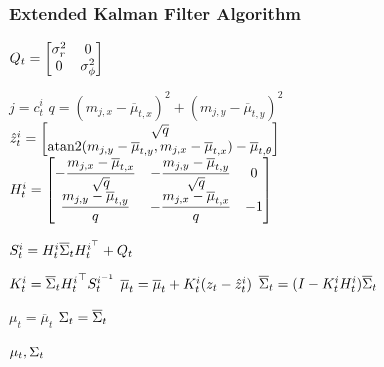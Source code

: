 \begin{frame}
   \frametitle{Extended Kalman Filter Algorithm}
   \footnotesize
   \begin{algorithmic}[1]
   \State
   $ Q_{t} =
   \begin{bmatrix}
   \sigma_{r}^{2} & 0\\
   0 & \sigma_{\phi}^{2}
    \end{bmatrix}
    $
   
    \State $ j = c_{t}^{i}$
    \State $ q = (m_{j,x}-\overline{\mu}_{t,x})^{2} + (m_{j,y}-\overline{\mu}_{t,y})^{2} $
    \State
    $ \hat{z}_{t}^{i} =
    \begin{bmatrix}
    \sqrt{q}\\
    \operatorname{atan2}(m_{j,y}-\overline{\mu}_{t,y}, m_{j,x}-\overline{\mu}_{t,x}) - \overline{\mu}_{t,\theta}
    \end{bmatrix}
    $
    \State
    $ H_{t}^{i} =
    \begin{bmatrix}
    -\dfrac{m_{j,x} - \overline{\mu}_{t,x}}{\sqrt{q}} & -\dfrac{m_{j,y} - \overline{\mu}_{t,y}}{\sqrt{q}} & 0\\
    \dfrac{m_{j,y} - \overline{\mu}_{t,y}}{q} & -\dfrac{m_{j,x} - \overline{\mu}_{t,x}}{q} & -1
    \end{bmatrix}
    $
   
    \State $S_{t}^{i} = H_{t}^{i} \overline{\Sigma}_{t} H_{t}^{i^{\top}} + Q_{t} $
   
    \State $K_{t}^{i} = \overline{\Sigma}_{t} {H_{t}^{i}}^{\top} S_{t}^{i^{-1}} $
    \State $\overline{\mu}_{t} = \overline{\mu}_{t} + K_{t}^{i}(z_{t} - \hat{z}_{t}^{i})$
    \State $\overline{\Sigma}_{t} = (I - K_{t}^{i}H_{t}^{i})\overline{\Sigma}_{t}$
   
    \EndFor
    \State $\mu_{t} = \overline{\mu}_{t}$
    \State $\Sigma_{t} = \overline{\Sigma}_{t}$
   
    \State \Return $\mu_{t}, \Sigma_{t}$
    \end{algorithmic}
\end{frame}

